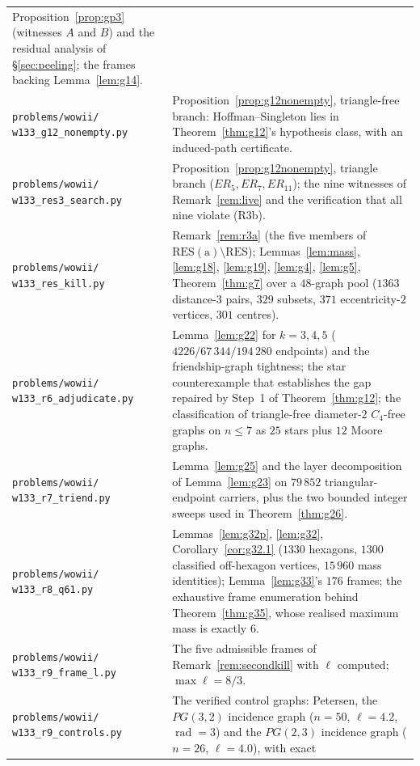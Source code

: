 \documentclass[11pt]{article}
\theoremstyle{plain}
\theoremstyle{definition}
\theoremstyle{remark}
\numberwithin{equation}{section}
\newcommand{\rad}{\operatorname{rad}}
\begin{document}
\begin{longtable}{@{}p{}p{}@{}}
Proposition~\ref{prop:gp3} (witnesses $A$ and $B$) and the residual analysis of
\S\ref{sec:peeling}; the frames backing Lemma~\ref{lem:g14}. \\
\texttt{problems/wowii/} \texttt{w133\_g12\_nonempty.py} &
Proposition~\ref{prop:g12nonempty}, triangle-free branch: Hoffman--Singleton lies in
Theorem~\ref{thm:g12}'s hypothesis class, with an induced-path certificate. \\
\texttt{problems/wowii/} \texttt{w133\_res3\_search.py} &
Proposition~\ref{prop:g12nonempty}, triangle branch ($ER_5,ER_7,ER_{11}$); the nine witnesses
of Remark~\ref{rem:live} and the verification that all nine violate (R3b). \\
\texttt{problems/wowii/} \texttt{w133\_res\_kill.py} &
Remark~\ref{rem:r3a} (the five members of $\mathrm{RES(a)}\setminus\mathrm{RES}$);
Lemmas~\ref{lem:mass}, \ref{lem:g18}, \ref{lem:g19}, \ref{lem:g4}, \ref{lem:g5},
Theorem~\ref{thm:g7} over a $48$-graph pool ($1363$ distance-$3$ pairs, $329$ subsets, $371$
eccentricity-$2$ vertices, $301$ centres). \\
\texttt{problems/wowii/} \texttt{w133\_r6\_adjudicate.py} &
Lemma~\ref{lem:g22} for $k = 3,4,5$ ($4226 / 67\,344 / 194\,280$ endpoints) and the
friendship-graph tightness; the star counterexample that establishes the gap repaired by
Step~1 of Theorem~\ref{thm:g12}; the classification of triangle-free diameter-$2$ $C_4$-free
graphs on $n \le 7$ as $25$ stars plus $12$ Moore graphs. \\
\texttt{problems/wowii/} \texttt{w133\_r7\_triend.py} &
Lemma~\ref{lem:g25} and the layer decomposition of Lemma~\ref{lem:g23} on $79\,852$
triangular-endpoint carriers, plus the two bounded integer sweeps used in
Theorem~\ref{thm:g26}. \\
\texttt{problems/wowii/} \texttt{w133\_r8\_q61.py} &
Lemmas~\ref{lem:g32p}, \ref{lem:g32}, Corollary~\ref{cor:g32.1} ($1330$ hexagons, $1300$
classified off-hexagon vertices, $15\,960$ mass identities); Lemma~\ref{lem:g33}'s $176$
frames; the exhaustive frame enumeration behind Theorem~\ref{thm:g35}, whose realised maximum
mass is exactly $6$. \\
\texttt{problems/wowii/} \texttt{w133\_r9\_frame\_l.py} &
The five admissible frames of Remark~\ref{rem:secondkill} with $\ell$ computed;
$\max \ell = 8/3$. \\
\texttt{problems/wowii/} \texttt{w133\_r9\_controls.py} &
The verified control graphs: Petersen, the $PG(3,2)$ incidence graph ($n=50$, $\ell = 4.2$,
$\rad = 3$) and the $PG(2,3)$ incidence graph ($n = 26$, $\ell = 4.0$), with exact

\end{longtable}
\end{document}
